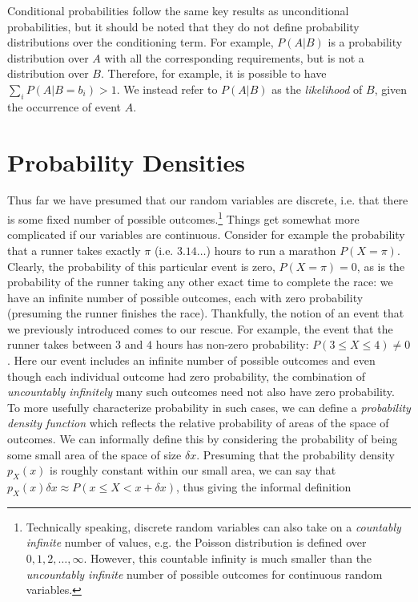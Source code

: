Conditional probabilities follow  the same key results as unconditional probabilities, but it 
should be noted that they do not define probability distributions over the conditioning term.  
For example, $P(A|B)$ is a probability distribution over $A$ with all the corresponding 
requirements, but is not a distribution over $B$.  Therefore,
for example, it is possible to have $\sum_{i} P(A|B=b_i) >1$.  We instead refer to $P(A|B)$
as the \emph{likelihood} of $B$, given the occurrence of event $A$.

\section{Probability Densities}
\label{sec:prob:den}

Thus far we have presumed that our random variables are discrete, i.e. that there is some fixed
number of possible outcomes.\footnote{Technically speaking, discrete random variables can also
	take on a \emph{countably infinite} number of values, e.g. the Poisson distribution is defined
	over $0,1,2,\dots,\infty$.  
	However, this countable infinity is much smaller than the \emph{uncountably infinite} number
	of possible outcomes for continuous random variables.}
Things get somewhat more complicated if our variables are continuous.  Consider for example
the probability that a runner takes exactly $\pi$ (i.e. $3.14\dots$) hours to run a marathon $P(X=\pi)$.  
Clearly, the probability
of this particular event is zero, $P(X=\pi)=0$, as is the probability of the runner taking any other exact time
to complete the race: we have an infinite number of possible outcomes, each with zero probability
(presuming the runner finishes the race).  Thankfully, the notion of an event that we previously
introduced comes to our rescue.  For example, the event that the runner takes between $3$ and
$4$ hours has non-zero probability: $P(3\le X \le 4) \neq 0$.  Here our event includes
an infinite number of possible outcomes and even though each individual outcome had
zero probability, the combination of \emph{uncountably infinitely} many such outcomes need
not also have zero probability.  To more usefully characterize probability in such cases, we can
define a \emph{probability density function} which reflects the relative probability of areas of
the space of outcomes.  We can informally define this by considering the probability
of being some small area of the space of size $\delta x$.  Presuming that the probability density
$p_{X}(x)$ is roughly constant within our small area, we can say that 
$p_{X}(x)\delta x \approx P(x\le X <x+\delta x)$, thus giving the informal definition
